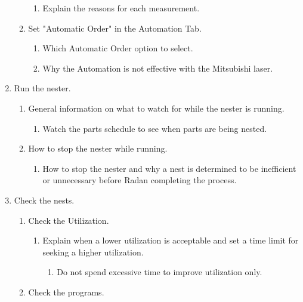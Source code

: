\documentclass[11pt, a4paper, oneside]{report}
\begin{document}
\begin{enumerate}
\begin{enumerate}
\begin{enumerate}
                    \item Explain the reasons for each measurement.
                \end{enumerate}
            \item Set "Automatic Order" in the Automation Tab.
                \begin{enumerate}
                    \item Which Automatic Order option to select.
                    \item Why the Automation is not effective with the Mitsubishi laser.
                \end{enumerate}
        \end{enumerate}
    \item Run the nester.
        \begin{enumerate}
            \item General information on what to watch for while the nester is running.
                \begin{enumerate}
                    \item Watch the parts schedule to see when parts are being nested.
                \end{enumerate}
            \item How to stop the nester while running.
                \begin{enumerate}
                    \item How to stop the nester and why a nest is determined to be inefficient or unnecessary before Radan completing the process.
                \end{enumerate}
        \end{enumerate}
    \item Check the nests.
        \begin{enumerate}
            \item Check the Utilization.
                \begin{enumerate}
                    \item Explain when a lower utilization is acceptable and set a time limit for seeking a higher utilization.
                        \begin{enumerate}
                            \item Do not spend excessive time to improve utilization only.
                        \end{enumerate}
                \end{enumerate}
            \item Check the programs.

\end{enumerate}
\end{enumerate}
\end{document}
